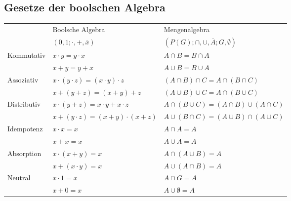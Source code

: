 \documentclass[6pt,a4paper]{scrartcl}
\begin{document}
\begin{multicols*}{3}
  \subsection{Gesetze der boolschen Algebra}
  \begin{tabular}{l|l|l}
                & Boolsche Algebra                                      & Mengenalgebra                                         \\
                & $({0,1};\cdot , +, \overline{x})$                     & $(P(G);\cap , \cup, \overline{A};G,\emptyset )$       \\ \hline
    Kommutativ  & $x \cdot y = y \cdot x$                               & $A \cap B = B \cap A$                                 \\
                & $x + y = y + x$                                       & $A \cup B = B \cup A$                                 \\
    Assoziativ  & $x \cdot (y \cdot z) = (x \cdot y) \cdot z$           & $(A \cap B) \cap C = A \cap (B \cap C)$               \\
                & $x + (y + z) = (x + y) + z$                           & $(A \cup B) \cup C = A \cap (B \cup C)$               \\
    Distributiv & $x \cdot (y + z) = x \cdot y + x \cdot z$             & $A \cap (B \cup C) = (A \cap B) \cup (A \cap C)$      \\
                & $x + (y \cdot z) = (x + y) \cdot (x + z)$             & $A \cup (B \cap C) = (A \cup B) \cap (A \cup C)$      \\
    Idempotenz  & $x \cdot x = x$                                       & $A \cap A = A$                                        \\
                & $x + x = x$                                           & $A \cup A = A$                                        \\
    Absorption  & $x \cdot (x+y) = x$                                   & $A \cap (A \cup B) = A$                               \\
                & $x + (x \cdot y) = x$                                 & $A \cup (A \cap B) = A$                               \\
    Neutral     & $x \cdot 1 = x$                                       & $A \cap G = A$                                        \\
                & $x + 0 = x$                                           & $A \cup \emptyset = A$                                \\

\end{tabular}
\end{multicols*}
\end{document}
